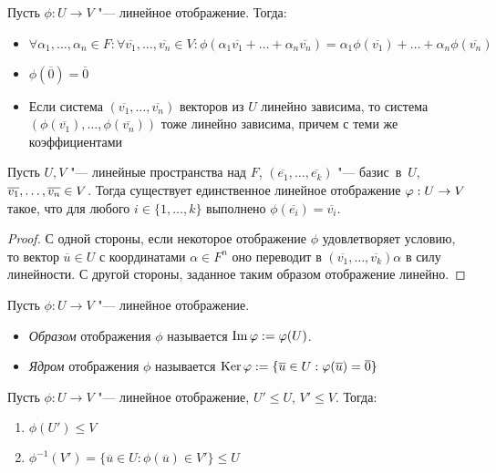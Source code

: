 \begin{note}
	Пусть $\phi: U \to V$ "--- линейное отображение. Тогда:
	\begin{itemize}
		\item $\forall \alpha_1, \dotsc, \alpha_n \in F: \forall \overline{v_1}, \dotsc, \overline{v_n} \in V: \phi(\alpha_1\overline{v_1} + \dots + \alpha_n\overline{v_n}) = \alpha_1\phi(\overline{v_1}) + \dots + \alpha_n\phi(\overline{v_n})$
		\item $\phi(\overline{0}) = \overline{0}$
		\item Если система $(\overline{v_1}, \dots, \overline{v_n})$ векторов из $U$ линейно зависима, то система $(\phi(\overline{v_1}), \dots, \phi(\overline{v_n}))$ тоже линейно зависима, причем с теми же коэффициентами
	\end{itemize}
\end{note}

\begin{proposition}
	Пусть $U, V$ "--- линейные пространства над $F$, $(\overline{e_1}, \dots, \overline{e_k})$ "--- базис~в~$U$, $\overline{v_1}, \dots, \overline{v_n} \hm{\in} V$. Тогда существует единственное линейное отображение $\phi: U \hm{\rightarrow} V$ такое, что для любого $i \in \{1, \dots, k\}$ выполнено $\phi(\overline{e_i}) = \overline{v_i}$.
\end{proposition}

\begin{proof}
	С одной стороны, если некоторое отображение $\phi$ удовлетворяет условию, то вектор $\overline{u} \in U$ с координатами $\alpha \in F^n$ оно переводит в $(\overline{v_1}, \dots, \overline{v_k})\alpha$ в силу линейности. С другой стороны, заданное таким образом отображение линейно.
\end{proof}

\begin{definition}
	Пусть $\phi: U \rightarrow V$ "--- линейное отображение.
	\begin{itemize}
		\item \textit{Образом} отображения $\phi$ называется $\operatorname{Im}{\varphi} := \varphi(U)$.
		\item \textit{Ядром} отображения $\phi$ называется $\operatorname{Ker}{\varphi} := \{\overline{u} \in U: \varphi(\overline{u})  = \overline{0}\}$
	\end{itemize}
\end{definition}

\begin{proposition}
	Пусть $\phi: U \rightarrow V$ "--- линейное отображение, $U' \le U$, $V' \le V$. Тогда:
	\begin{enumerate}
		\item $\phi(U') \le V$
		\item $\phi^{-1}(V') = \{\overline{u} \in U: \phi(\overline{u}) \in V'\} \le U$
	\end{enumerate}
\end{proposition}

